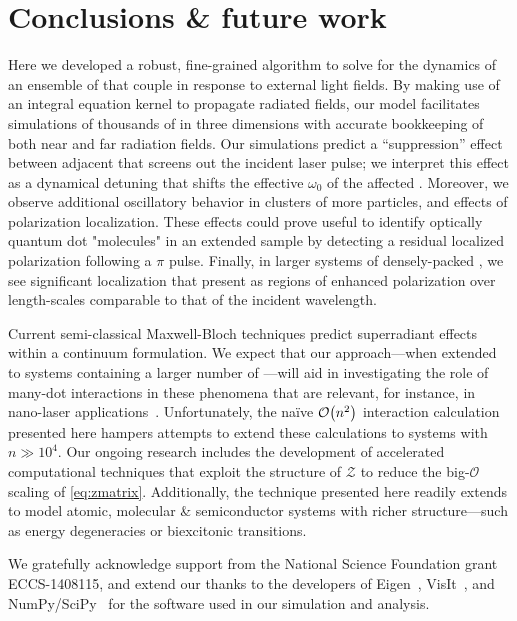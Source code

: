 \section{\label{section:conclusion}Conclusions \& future work}
Here we developed a robust, fine-grained algorithm to solve for the dynamics of an ensemble of \qds{} that couple in response to external light fields.
By making use of an integral equation kernel to propagate radiated fields, our model facilitates simulations of thousands of \qds{} in three dimensions with accurate bookkeeping of both near and far radiation fields.
Our simulations predict a ``suppression'' effect between adjacent \qds{} that screens out the incident laser pulse;
we interpret this effect as a dynamical detuning that shifts the effective $\omega_0$ of the affected \qds{}. Moreover, we observe additional oscillatory behavior in clusters of more particles, and effects of polarization localization. These effects could prove useful to identify optically quantum dot "molecules" in an extended sample by detecting a residual localized polarization following a $\pi$ pulse.
Finally, in larger systems of densely-packed \qds{}, we see significant localization that present as regions of enhanced polarization over length-scales comparable to that of the incident wavelength.

Current semi-classical Maxwell-Bloch techniques predict superradiant effects~\cite{Gross1982,PhysRevA.4.302,PhysRevA.4.854} within a continuum formulation. We expect that our approach---when extended to systems containing a larger number of \qds{}---will aid in investigating the role of many-dot interactions in these phenomena that are relevant, for instance, in nano-laser applications~\cite{jahnke2016giant}.
Unfortunately, the na\"ive $\mathcal{O}\qty(n^2)$ interaction calculation presented here hampers attempts to extend these calculations to systems with $n \gg 10^4$.
Our ongoing research includes the development of accelerated computational techniques that exploit the structure of $\mathcal{Z}$ to reduce the big-$\mathcal{O}$ scaling of \cref{eq:zmatrix}.
Additionally, the technique presented here readily extends to model atomic, molecular \& semiconductor systems with richer structure---such as energy degeneracies or biexcitonic transitions.

\acknowledgments
We gratefully acknowledge support from the National Science Foundation grant ECCS-1408115, and extend our thanks to the developers of
Eigen~\cite{Eigen}, VisIt~\cite{VisIt}, and NumPy/SciPy~\cite{NumPy,SciPy} for the software used in our simulation and analysis.
